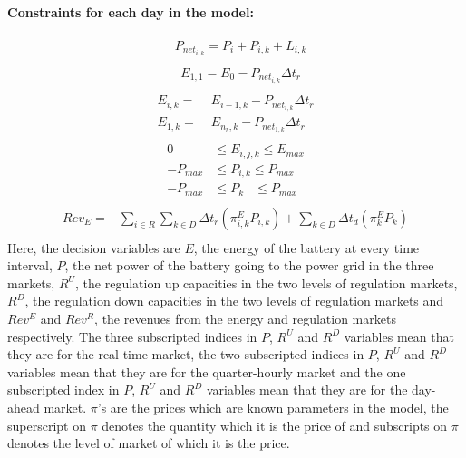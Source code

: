 \documentclass[11pt,twoside]{article}
\begin{document}
\paragraph{Constraints for each day in the model:}
\begin{subequations}
\begin{align}
&P_{{net}_{i,k}} = P_{i} + P_{i,k} + L_{i,k}\\
\end{align}
\label{eq:Pnet}
\end{subequations}
\begin{subequations}
\begin{align}
&E_{1,1} = E_{0} - P_{{net}_{i,k}}\Delta t_r\\
\end{align}
\label{eq:eq1}
\end{subequations}
\vspace{-0.45in}
\begin{subequations}
\begin{align}
E_{i,k} =&\; E_{i-1,k}- P_{{net}_{i,k}}\Delta t_r\\
E_{1,k} =&\; E_{n_r,k}- P_{{net}_{1,k}} \Delta t_r\\
\end{align}
\label{eq:eq2}
\end{subequations}
\vspace{-0.45in}
\begin{subequations}
\begin{align}
0 & \leq E_{i,j,k} \leq E_{max}\\
-P_{max} & \leq P_{i,k} \leq P_{max}\\
-P_{max} & \leq P_{k}\phantom{i,} \leq P_{max}\\
\end{align}
\label{eq:eq4}
\end{subequations}\vspace{-0.45in}
\begin{subequations}
\begin{align}
Rev_E =& \sum_{i \in R} \sum_{k \in D} \Delta t_r(\pi^E_{i,k}P_{i,k}) + \sum_{k \in D}\Delta t_d(\pi^E_{k}P_{k})\\
\end{align}
\label{eq5}
\end{subequations}
Here, the decision variables are $E$, the energy of the battery at every time interval, $P$, the net power of the battery going to the power grid in the three markets, $R^U$, the regulation up capacities in the two levels of regulation markets, $R^D$, the regulation down capacities in the two levels of regulation markets and $Rev^E$ and $Rev^R$, the revenues from the energy and regulation markets respectively. The three subscripted indices in $P$, $R^U$ and $R^D$ variables mean that they are for the real-time market, the two subscripted indices in $P$, $R^U$ and $R^D$ variables mean that they are for the quarter-hourly market and the one subscripted index in $P$, $R^U$ and $R^D$ variables mean that they are for the day-ahead market. $\pi$'s are the prices which are known parameters in the model, the superscript on $\pi$ denotes the quantity which it is the price of and subscripts on $\pi$ denotes the level of market of which it is the price.
\end{document}
